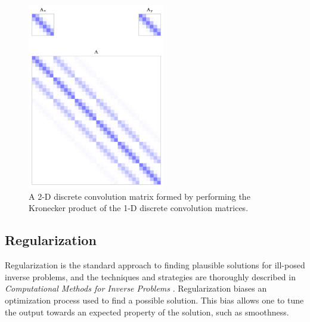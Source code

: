 \documentclass[letterpaper, 10pt, titlepage, twocolumn]{article}
\def\figurewidthalt{6cm}
\begin{document}
\begin{figure}[H]
  \centering
  \includegraphics[width=\figurewidthalt]{2dkernel.png}
  \caption{A 2-D discrete convolution matrix formed by performing the Kronecker product of the 1-D discrete convolution matrices.}
  \label{fig:kronecker}
\end{figure}

\subsection*{Regularization}
Regularization is the standard approach to finding plausible solutions for ill-posed inverse problems, and the techniques and strategies are thoroughly described in \emph{Computational Methods for Inverse Problems} \cite{vogel_computational_2002}. Regularization biases an optimization process used to find a possible solution. This bias allows one to tune the output towards an expected property of the solution, such as smoothness.
\end{document}
